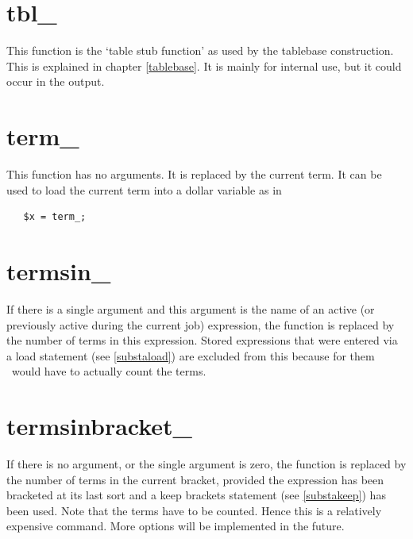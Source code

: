 \section{tbl\_}
\label{funtbl}
\noindent This function is the `table stub function' as used by the 
tablebase construction. This is explained in chapter 
\ref{tablebase}. It is mainly for internal use, but it could occur in the 
output.


\section{term\_}
\label{funterm}
\noindent This function has no arguments. It is replaced by the current 
term. It can be used to load the current term into a dollar variable as in
\begin{verbatim}
   $x = term_;
\end{verbatim}


\section{termsin\_}
\label{funtermsin}
\noindent If there is a single argument and this argument is the name of an 
active (or previously active during the current job) expression, the 
function is replaced by the number of terms in this 
expression. Stored expressions that were entered via a load statement (see 
\ref{substaload}) are excluded from this because for them \FORM\ would have 
to actually count the terms.

 
\section{termsinbracket\_}
\label{funtermsinbracket}
\noindent If there is no argument, or the single argument is zero, the 
function is replaced by the number of terms in the current 
bracket, provided the expression has been bracketed at its 
last sort and a keep brackets statement (see \ref{substakeep}) has been 
used. Note that the terms have to be counted. Hence this is a relatively 
expensive command. More options will be implemented in the future.

